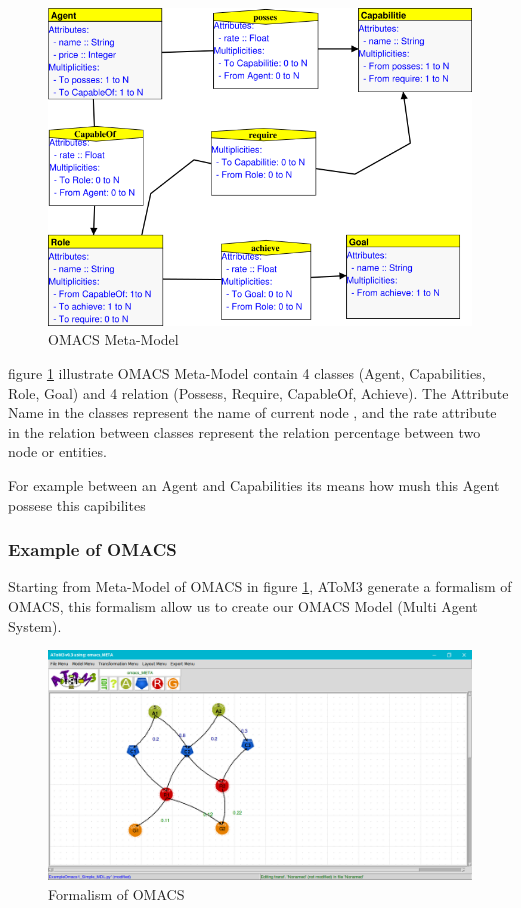 \begin{figure}[th]
	\centering
 	\includegraphics[scale=0.7]{ch3/img/omacs_meta}
	\caption{\label{fig:OMACS Meta-Model}OMACS Meta-Model}
\end{figure} 
\vspace{0.9cm}
figure \ref{fig:OMACS Meta-Model} illustrate OMACS Meta-Model contain 4 classes (Agent, Capabilities, Role, Goal) 
and 4 relation (Possess, Require, CapableOf, Achieve). 
The Attribute Name in the classes represent the name of current node ,
and the rate attribute in the relation between classes represent the relation percentage between two node or entities.

For example between an Agent and Capabilities its means how mush this Agent possese this capibilites
\pagebreak
\subsubsection{Example of OMACS}

Starting from Meta-Model of OMACS in figure \ref{fig:OMACS Meta-Model}, AToM3 generate a formalism of OMACS, this formalism allow us to create our OMACS Model (Multi Agent System).
\vspace{0.1cm}
\begin{figure}[th]
	\centering
 	\includegraphics[scale=0.3]{ch3/img/omacs_model}
	\caption{\label{fig:OMACS Model}Formalism of OMACS}
\end{figure} 

